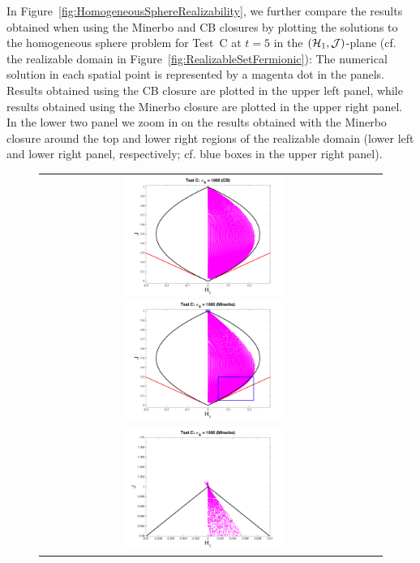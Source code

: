 In Figure~\ref{fig:HomogeneousSphereRealizability}, we further compare the results obtained when using the Minerbo and CB closures by plotting the solutions to the homogeneous sphere problem for Test~C at $t=5$ in the $(\mathcal{H}_{1},\mathcal{J})$-plane (cf. the realizable domain in Figure~\ref{fig:RealizableSetFermionic}):  The numerical solution in each spatial point is represented by a magenta dot in the panels.  
Results obtained using the CB closure are plotted in the upper left panel, while results obtained using the Minerbo closure are plotted in the upper right panel.  
In the lower two panel we zoom in on the results obtained with the Minerbo closure around the top and lower right regions of the realizable domain (lower left and lower right panel, respectively; cf. blue boxes in the upper right panel).  
\begin{figure}[h]
  \centering
  \begin{tabular}{cc}
    \includegraphics[width=0.5\textwidth]{figures/HomogeneousSphere_Realizability_Chi_1e3_CB}
    \includegraphics[width=0.5\textwidth]{figures/HomogeneousSphere_Realizability_Chi_1e3_Minerbo} \\
    \includegraphics[width=0.5\textwidth]{figures/HomogeneousSphere_Realizability_Chi_1e3_Minerbo_Box1}

\end{tabular}
\end{figure}
